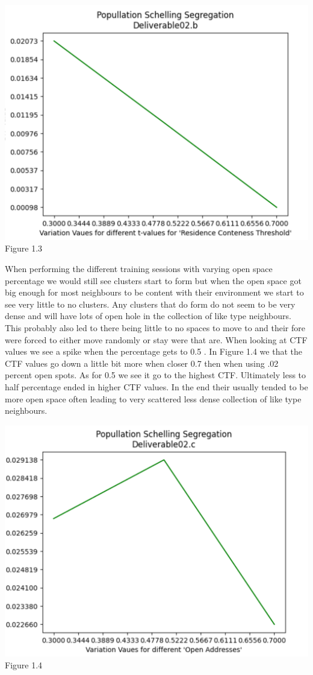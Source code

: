 \documentclass[letterpaper]{article}
\begin{document}
\begin{center}
\includegraphics[scale=0.6]{./Images/Deliverableb_Figure1.3} 
Figure 1.3
\end{center}
When performing the different training sessions with varying open space percentage we would still see clusters start to form but when the open space got big enough for most neighbours to be content with their environment we start to see very little to no clusters.  Any clusters that do form do not seem to be very dense and will have lots of open hole in the collection of like type neighbours.  This probably also led to there being little to no spaces to move to and their fore were forced to either move randomly or stay were that are.  When looking at CTF values we see a spike when the percentage gets to 0.5 .  In Figure 1.4 we that the CTF values go down a little bit more when closer 0.7 then when using .02 percent open spots.  As for 0.5 we see it go to the highest CTF.  Ultimately less to half percentage ended in higher CTF values.  In the end their usually tended to be more open space often leading to very scattered less dense collection of like type neighbours. \\
\begin{center}
\includegraphics[scale=0.6]{./Images/DeliverableC_Figure1.4}
Figure 1.4
\end{center}
\end{document}
